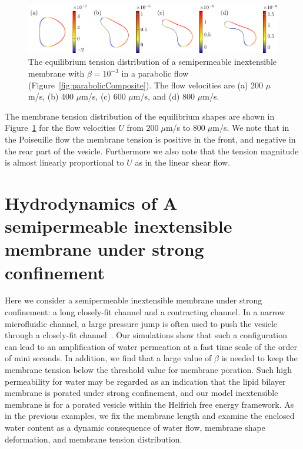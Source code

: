 \documentclass[prb,preprint,showpacs,preprintnumbers,amsmath,amssymb,longbibliography]{revtex4-1}
\newif\ifTikz
\begin{document}
\begin{figure}[htp]
  \centering
  \ifTikz
  
  \else
  \includegraphics{figures/parabolicTensions.pdf}
  \fi
  \caption{\label{fig:parabolicTensions} The equilibrium tension
  distribution of a semipermeable inextensible membrane with $\beta=10^{-3}$ in a
  parabolic flow (Figure~\ref{fig:parabolicComposite}). The flow
  velocities are (a) 200 $\mu$m/s, (b) 400 $\mu$m/s, (c) 600 $\mu$m/s,
  and (d) 800 $\mu$m/s.}
\end{figure}
 The membrane tension distribution of the equilibrium shapes are shown
 in Figure~\ref{fig:parabolicTensions} for the flow velocities $U$ from
 $200\;\mu$m/s to $800 \;\mu$m/s. We note that in the Poiseuille flow
 the membrane tension is positive in the front, and negative in the rear
 part of the vesicle. Furthermore we also note that the tension
 magnitude is almost linearly proportional to $U$ as in the linear shear
 flow.


\section{Hydrodynamics of A semipermeable inextensible membrane under strong confinement\label{sec:confinement}}
Here we consider a semipermeable inextensible membrane under strong
confinement: a long closely-fit channel and a contracting channel. In a
narrow microfluidic channel, a large pressure jump is often used to push
the vesicle through a closely-fit channel~\cite{abk-fai-sto2006}. Our
simulations show that such a configuration can lead to an amplification
of water permeation at a fast time scale of the order of
 mini seconds.  In addition, we find that a
large value of $\beta$ is needed to keep the membrane tension below the
threshold value for membrane poration. Such high permeability for water
may be regarded as an indication that the lipid bilayer membrane is
porated under strong confinement, and our model inextensible membrane is
for a porated vesicle within the Helfrich free energy framework. As in
the previous examples, we fix the membrane length and examine the
enclosed water content as a dynamic consequence of water flow, membrane
shape deformation, and membrane tension distribution.
\end{document}
